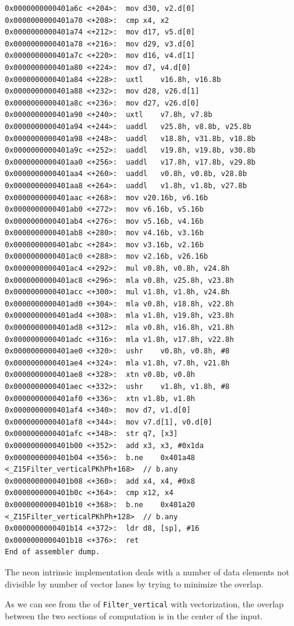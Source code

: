 \documentclass[
  course = {{ESE532 System-on-a-Chip}},
  quartile = {{}},
  assignment = 4,
  name = {{Sheil Sarda, Kate Ballard}},
  studentnumber = {{}},
  email = {{sheils@seas.upenn.edu, kballard@seas.upenn.edu}},
  firstexercise = 1
]{aga-homework}
\begin{document}
\begin{verbatim}
0x0000000000401a6c <+204>:	mov	d30, v2.d[0]
0x0000000000401a70 <+208>:	cmp	x4, x2
0x0000000000401a74 <+212>:	mov	d17, v5.d[0]
0x0000000000401a78 <+216>:	mov	d29, v3.d[0]
0x0000000000401a7c <+220>:	mov	d16, v4.d[1]
0x0000000000401a80 <+224>:	mov	d7, v4.d[0]
0x0000000000401a84 <+228>:	uxtl	v16.8h, v16.8b
0x0000000000401a88 <+232>:	mov	d28, v26.d[1]
0x0000000000401a8c <+236>:	mov	d27, v26.d[0]
0x0000000000401a90 <+240>:	uxtl	v7.8h, v7.8b
0x0000000000401a94 <+244>:	uaddl	v25.8h, v8.8b, v25.8b
0x0000000000401a98 <+248>:	uaddl	v18.8h, v31.8b, v18.8b
0x0000000000401a9c <+252>:	uaddl	v19.8h, v19.8b, v30.8b
0x0000000000401aa0 <+256>:	uaddl	v17.8h, v17.8b, v29.8b
0x0000000000401aa4 <+260>:	uaddl	v0.8h, v0.8b, v28.8b
0x0000000000401aa8 <+264>:	uaddl	v1.8h, v1.8b, v27.8b
0x0000000000401aac <+268>:	mov	v20.16b, v6.16b
0x0000000000401ab0 <+272>:	mov	v6.16b, v5.16b
0x0000000000401ab4 <+276>:	mov	v5.16b, v4.16b
0x0000000000401ab8 <+280>:	mov	v4.16b, v3.16b
0x0000000000401abc <+284>:	mov	v3.16b, v2.16b
0x0000000000401ac0 <+288>:	mov	v2.16b, v26.16b
0x0000000000401ac4 <+292>:	mul	v0.8h, v0.8h, v24.8h
0x0000000000401ac8 <+296>:	mla	v0.8h, v25.8h, v23.8h
0x0000000000401acc <+300>:	mul	v1.8h, v1.8h, v24.8h
0x0000000000401ad0 <+304>:	mla	v0.8h, v18.8h, v22.8h
0x0000000000401ad4 <+308>:	mla	v1.8h, v19.8h, v23.8h
0x0000000000401ad8 <+312>:	mla	v0.8h, v16.8h, v21.8h
0x0000000000401adc <+316>:	mla	v1.8h, v17.8h, v22.8h
0x0000000000401ae0 <+320>:	ushr	v0.8h, v0.8h, #8
0x0000000000401ae4 <+324>:	mla	v1.8h, v7.8h, v21.8h
0x0000000000401ae8 <+328>:	xtn	v0.8b, v0.8h
0x0000000000401aec <+332>:	ushr	v1.8h, v1.8h, #8
0x0000000000401af0 <+336>:	xtn	v1.8b, v1.8h
0x0000000000401af4 <+340>:	mov	d7, v1.d[0]
0x0000000000401af8 <+344>:	mov	v7.d[1], v0.d[0]
0x0000000000401afc <+348>:	str	q7, [x3]
0x0000000000401b00 <+352>:	add	x3, x3, #0x1da
0x0000000000401b04 <+356>:	b.ne	0x401a48 <_Z15Filter_verticalPKhPh+168>  // b.any
0x0000000000401b08 <+360>:	add	x4, x4, #0x8
0x0000000000401b0c <+364>:	cmp	x12, x4
0x0000000000401b10 <+368>:	b.ne	0x401a20 <_Z15Filter_verticalPKhPh+128>  // b.any
0x0000000000401b14 <+372>:	ldr	d8, [sp], #16
0x0000000000401b18 <+376>:	ret
End of assembler dump.
\end{verbatim}

\subexercise
The neon intrinsic implementation deals with a number of data elements not divisible by number of vector lanes by trying to minimize the overlap.

As we can see from the of \verb|Filter_vertical| with vectorization, the overlap between the two sections of computation is in the center of the input. 
\end{document}
